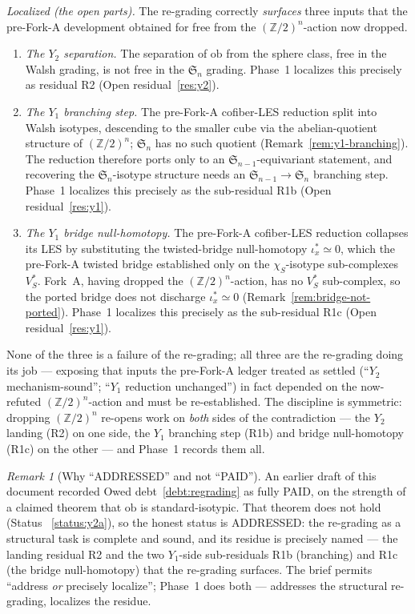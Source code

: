 \documentclass[11pt,oneside]{amsart}
\theoremstyle{plain}
\theoremstyle{definition}
\theoremstyle{remark}
\newtheorem{remark}[theorem]{Remark}
\theoremstyle{honeststyle}
\newcommand{\Sym}{\mathfrak{S}}
\newcommand{\Z}{\mathbb{Z}}
\newcommand{\ob}{\mathrm{ob}}
\newcommand{\walsh}[1]{\chi_{#1}}
\begin{document}
\noindent\emph{Localized (the open parts).} The re-grading correctly
\emph{surfaces} three inputs that the pre-Fork-A development obtained
for free from the $(\Z/2)^n$-action now dropped.
\begin{enumerate}[label=\textup{(\roman*)},leftmargin=2.2em]
\item \emph{The $Y_2$ separation.} The separation of $\ob$ from the
  sphere class, free in the Walsh grading, is not free in the $\Sym_n$
  grading. Phase~1 localizes this precisely as residual R2 (Open
  residual~\ref{res:y2}).
\item \emph{The $Y_1$ branching step.} The pre-Fork-A cofiber-LES
  reduction split into Walsh isotypes, descending to the smaller cube
  via the abelian-quotient structure of $(\Z/2)^n$; $\Sym_n$ has no
  such quotient (Remark~\ref{rem:y1-branching}). The reduction
  therefore ports only to an $\Sym_{n-1}$-equivariant statement, and
  recovering the $\Sym_n$-isotype structure needs an
  $\Sym_{n-1}\to\Sym_n$ branching step. Phase~1 localizes this
  precisely as the sub-residual R1b (Open residual~\ref{res:y1}).
\item \emph{The $Y_1$ bridge null-homotopy.} The pre-Fork-A
  cofiber-LES reduction collapses its LES by substituting the
  twisted-bridge null-homotopy $\iota_x^{*}\simeq0$, which the
  pre-Fork-A twisted bridge established only on the
  $\walsh{S}$-isotype sub-complexes $V_S^{*}$. Fork~A, having dropped
  the $(\Z/2)^n$-action, has no $V_S^{*}$ sub-complex, so the ported
  bridge does not discharge $\iota_x^{*}\simeq0$
  (Remark~\ref{rem:bridge-not-ported}). Phase~1 localizes this
  precisely as the sub-residual R1c (Open residual~\ref{res:y1}).
\end{enumerate}
None of the three is a failure of the re-grading; all three are the
re-grading doing its job --- exposing that inputs the pre-Fork-A
ledger treated as settled (``$Y_2$ mechanism-sound''; ``$Y_1$
reduction unchanged'') in fact depended on the now-refuted
$(\Z/2)^n$-action and must be re-established. The discipline is
symmetric: dropping $(\Z/2)^n$ re-opens work on \emph{both} sides of
the contradiction --- the $Y_2$ landing (R2) on one side, the $Y_1$
branching step (R1b) and bridge null-homotopy (R1c) on the other ---
and Phase~1 records them all.

\begin{remark}[Why ``ADDRESSED'' and not ``PAID'']
\label{rem:debt1-addressed}
An earlier draft of this document recorded Owed debt~\ref{debt:regrading}
as fully \textsf{PAID}, on the strength of a claimed theorem that
$\ob$ is standard-isotypic. That theorem does not hold (Status~%
\ref{status:y2a}), so the honest status is \textsf{ADDRESSED}: the
re-grading as a structural task is complete and sound, and its
residue is precisely named --- the landing residual R2 and the two
$Y_1$-side sub-residuals R1b (branching) and R1c (the bridge
null-homotopy) that the re-grading surfaces. The brief
permits ``address \emph{or} precisely localize''; Phase~1 does both
--- addresses the structural re-grading, localizes the residue.
\end{remark}
\end{document}
